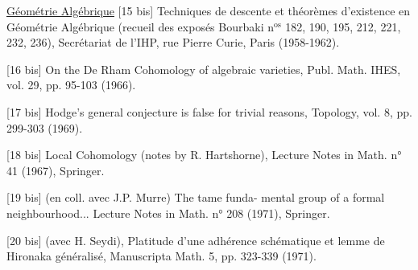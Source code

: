 
\uline{Géométrie Algébrique}
[15 bis] Techniques de descente et théorèmes d'existence
en Géométrie Algébrique (recueil des exposés
Bourbaki n$^{\text{os}}$ 182, 190, 195, 212, 221, 232,
236), Secrétariat de l'IHP, rue Pierre Curie,
Paris (1958-1962).

[16 bis] On the De Rham Cohomology of algebraic varieties,
Publ. Math. IHES, vol. 29, pp. 95-103 (1966).

[17 bis] Hodge's general conjecture is false for
trivial reasons, Topology, vol. 8,
pp. 299-303 (1969).

[18 bis] Local Cohomology (notes by R. Hartshorne),
Lecture Notes in Math. n° 41 (1967), Springer.

[19 bis] (en coll. avec J.P. Murre) The tame funda-%
mental group of a formal neighbourhood...
Lecture Notes in Math. n° 208 (1971), Springer.

[20 bis] (avec H. Seydi), Platitude d'une adhérence
schématique et lemme de Hironaka généralisé,
Manuscripta Math. 5, pp. 323-339 (1971).

